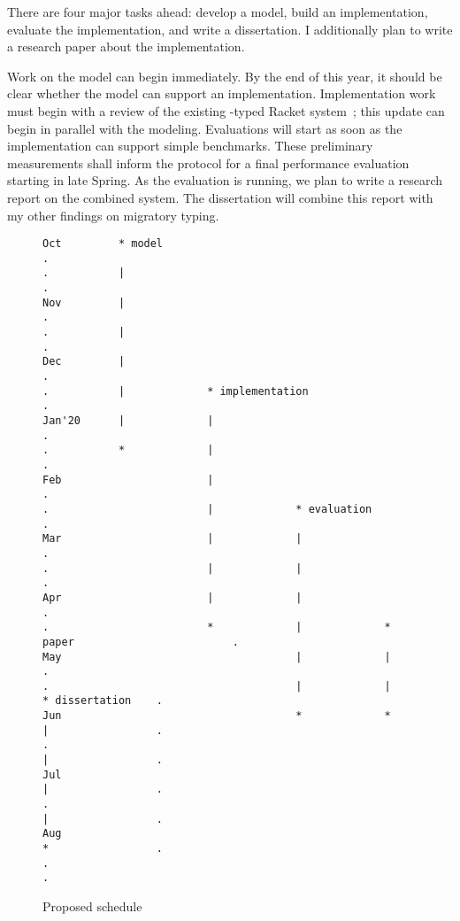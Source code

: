 There are four major tasks ahead:
  develop a model,
  build an implementation,
  evaluate the implementation,
  and write a dissertation.
I additionally plan to write a research paper about the
 implementation.

Work on the model can begin immediately.
By the end of this year, it should be clear whether the model can support
 an implementation.
Implementation work must begin with a review of the existing
 \tshallow{}-typed Racket system~\cite{gf-icfp-2018};
 this update can begin in parallel with the modeling.
Evaluations will start as soon as the implementation can support simple
 benchmarks.
These preliminary measurements shall inform the protocol for a final
 performance evaluation starting in late Spring.
As the evaluation is running, we plan to write a research report on the
 combined system.
The dissertation will combine this report with my other findings on
 migratory typing.

\begin{figure}[t]
  \renewcommand{\FancyVerbFormatLine}[1]{\ifodd\value{FancyVerbLine}\colorbox{lightgray}{#1}\else\colorbox{white}{#1}\fi}
\begin{Verbatim}
Oct         * model                                                                   .
.           |                                                                         .
Nov         |                                                                         .
.           |                                                                         .
Dec         |                                                                         .
.           |             * implementation                                            .
Jan'20      |             |                                                           .
.           *             |                                                           .
Feb                       |                                                           .
.                         |             * evaluation                                  .
Mar                       |             |                                             .
.                         |             |                                             .
Apr                       |             |                                             .
.                         *             |             * paper                         .
May                                     |             |                               .
.                                       |             |             * dissertation    .
Jun                                     *             *             |                 .
.                                                                   |                 .
Jul                                                                 |                 .
.                                                                   |                 .
Aug                                                                 *                 .
.                                                                                     .
\end{Verbatim}
  \caption{Proposed schedule}
  \label{fig:schedule}
\end{figure}


